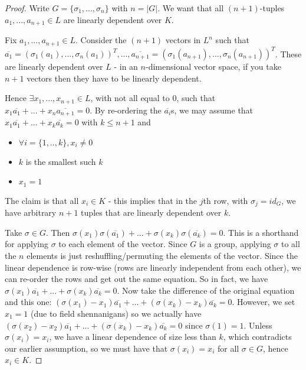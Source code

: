 \documentclass{article}
\theoremstyle{definition}
\theoremstyle{plain}%
\theoremstyle{remark}
\begin{document}
\begin{proof}
Write $G = \{\sigma_1, ..., \sigma_n\}$ with $n = |G|$. We want that all $(n+1)$-tuples $a_1, ..., a_{n+1} \in L$ are linearly dependent over $K$.

Fix $a_1, ..., a_{n+1} \in L$. Consider the $(n+1)$ vectors in $L^n$ such that $\overline{a_1} = (\sigma_1(a_1), ..., \sigma_n(a_1))^T,..., \overline{a_{n+1}} = (\sigma_1(a_{n+1}), ..., \sigma_n(a_{n+1}))^T$. These are linearly dependent over $L$ - in an $n$-dimensional vector space, if you take $n+1$ vectors then they have to be linearly dependent.

Hence $\exists x_1,..., x_{n+1} \in L$, with not all equal to 0, such that $x_1\overline{a_1} + ... + x_n\overline{a_{n+1}} = 0$. By re-ordering the $\overline{a_i}$s, we may assume that $x_1\overline{a_1} +  ... + x_k\overline{a_k} = 0$ with $k \le n+1$ and 
\begin{itemize}
    \item $\forall i = \{1,..,k\}, x_i \ne 0$
    \item $k$ is the smallest such $k$
    \item $x_1 = 1$
\end{itemize}
The claim is that all $x_i \in K$ -  this implies that in the $j$th row, with $\sigma_j = id_G$, we have arbitrary $n+1$ tuples that are linearly dependent over $k$.

Take $\sigma \in G$. Then $\sigma(x_1) \sigma(\overline{a_1}) + ... + \sigma(x_k)\sigma(\overline{a_k}) = 0$. This is a shorthand for applying $\sigma$ to each element of the vector. Since $G$ is a group, applying $\sigma$ to all the $n$ elements is just reshuffling/permuting the elements of the vector. Since the linear dependence is row-wise (rows are linearly independent from each other), we can re-order the rows and get out the same equation. So in fact, we have $\sigma(x_1) \overline{a_1} + ... + \sigma(x_k)\overline{a_k} = 0$. Now take the difference of the original equation and this one: $(\sigma(x_1) - x_1) \overline{a_1} + ... + (\sigma(x_k) - x_k)\overline{a_k} = 0$. However, we set $x_1 = 1$ (due to field shennanigans) so we actually have $(\sigma(x_2) - x_2) \overline{a_1} + ... + (\sigma(x_k) - x_k)\overline{a_k} = 0$ since $\sigma(1) = 1$. Unless $\sigma(x_i) = x_i$, we have a linear dependence of size less than $k$, which contradicts our earlier assumption, so we must have that $\sigma(x_i) = x_i$ for all $\sigma \in G$, hence $x_i \in K$.
 \end{proof}
\end{document}
